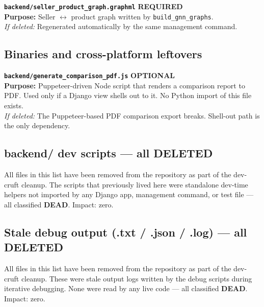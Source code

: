 \documentclass[10pt,a4paper]{article}
\newcommand{\reqBadge}{\textcolor{zarMidGreen}{\textbf{REQUIRED}}}
\newcommand{\optBadge}{\textcolor{zarAmber}{\textbf{OPTIONAL}}}
\newcommand{\deadBadge}{\textcolor{zarRed}{\textbf{DEAD}}}
\newcommand{\fileEntry}[4]{%
  \par\noindent
  \begin{tcolorbox}[
    enhanced,
    breakable,
    colback=zarPaleGreen,
    colframe=zarMidGreen,
    arc=1pt,
    boxrule=0.4pt,
    left=6pt, right=6pt, top=3pt, bottom=3pt,
    fontupper=\small,
    before skip=2pt, after skip=4pt,
  ]
  \texttt{\textbf{#1}} \hfill {\small #2}\\[1pt]
  {\footnotesize\textbf{Purpose:} #3}\\[1pt]
  {\footnotesize\textit{If deleted:} #4}
  \end{tcolorbox}
}
\begin{document}
\fileEntry{backend/seller\_product\_graph.graphml}{\reqBadge}{Seller $\leftrightarrow$ product graph written by \texttt{build\_gnn\_graphs}.}{Regenerated automatically by the same management command.}


\subsection{Binaries and cross-platform leftovers}

\fileEntry{backend/generate\_comparison\_pdf.js}{\optBadge}{Puppeteer-driven Node script that renders a comparison report to PDF. Used only if a Django view shells out to it. No Python import of this file exists.}{The Puppeteer-based PDF comparison export breaks. Shell-out path is the only dependency.}

\subsection{backend/ dev scripts — all DELETED}

\begin{tcolorbox}[
  enhanced,
  colback=zarPaleGreen,
  colframe=zarMidGreen,
  arc=1pt,
  fontupper=\footnotesize\ttfamily,
  title={\small\bfseries\color{white} backend/ dev scripts — all DELETED},
  coltitle=white,
  colbacktitle=zarMidGreen,
]
All files in this list have been removed from the repository as part of
the dev-cruft cleanup. The scripts that previously lived here were
standalone dev-time helpers not imported by any Django app, management
command, or test file --- all classified \deadBadge. Impact: zero.
\end{tcolorbox}

\subsection{Stale debug output (.txt / .json / .log) — all DELETED}

\begin{tcolorbox}[
  enhanced,
  colback=zarPaleGreen,
  colframe=zarMidGreen,
  arc=1pt,
  fontupper=\footnotesize\ttfamily,
  title={\small\bfseries\color{white} backend/ stale outputs — all DELETED},
  coltitle=white,
  colbacktitle=zarMidGreen,
]
All files in this list have been removed from the repository as part of
the dev-cruft cleanup. These were stale output logs written by the debug
scripts during iterative debugging. None were read by any live code ---
all classified \deadBadge. Impact: zero.
\end{tcolorbox}
\end{document}
